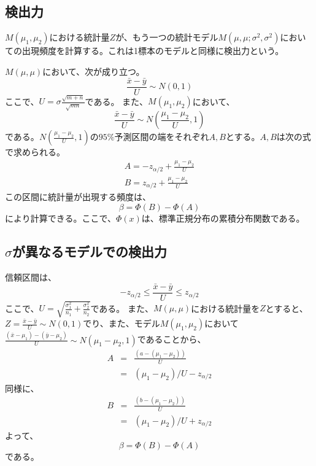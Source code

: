 \subsection{検出力}
$M(\mu_1,\mu_2)$における統計量$Z$が、もう一つの統計モデル$M(\mu,\mu;\sigma^2,\sigma^2)$においての出現頻度を計算する。これは1標本のモデルと同様に検出力という。

$M(\mu,\mu)$において、次が成り立つ。
\begin{equation*}
    \frac{\bar{x}-\bar{y}}{U} \sim N(0,1)
\end{equation*}
ここで、$U=\sigma\frac{\sqrt{m+n}}{\sqrt{mn}}$である。
また、$M(\mu_1,\mu_2)$において、
\begin{equation*}
    \frac{\bar{x}-\bar{y}}{U}\sim N(\frac{\mu_1-\mu_2}{U},1)
\end{equation*}
である。$N(\frac{\mu_1-\mu_2}{U},1)$の$95\%$予測区間の端をそれぞれ$A,B$とする。$A,B$は次の式で求められる。
\begin{eqnarray*}
    A = -z_{\alpha/2}+\frac{\mu_1-\mu_2}{U}\\
    B = z_{\alpha/2}+\frac{\mu_1-\mu_2}{U}
\end{eqnarray*}
この区間に統計量が出現する頻度は、
\begin{equation*}
    \beta = \varPhi(B)-\varPhi(A)
\end{equation*}
により計算できる。ここで、$\varPhi(x)$は、標準正規分布の累積分布関数である。

\subsection{$\sigma$が異なるモデルでの検出力}
信頼区間は、
\begin{equation*}
    -z_{\alpha/2} \leq \frac{\bar{x}-\bar{y}}{U} \leq z_{\alpha/2}
\end{equation*}
ここで、$U=\sqrt{\frac{\sigma^2_1}{n_1}+\frac{\sigma^2_2}{n_2}}$である。
また、$M(\mu,\mu)$における統計量を$Z$とすると、$Z = \frac{\bar{x}-\bar{y}}{U}\sim N(0,1)$でり、また、モデル$M(\mu_1,\mu_2)$において$\frac{(\bar{x}-\mu_1)-(\bar{y}-\mu_2)}{U} \sim N(\mu_1-\mu_2,1)$であることから、
\begin{eqnarray*}
    A &=& \frac{(a-(\mu_1-\mu_2))}{U} \\
        &=& (\mu_1-\mu_2)/U-z_{\alpha/2}
\end{eqnarray*}
同様に、
\begin{eqnarray*}
    B &=& \frac{(b-(\mu_1-\mu_2))}{U} \\
        &=& (\mu_1-\mu_2)/U+z_{\alpha/2}
\end{eqnarray*}
よって、
\begin{equation*}
    \beta = \varPhi(B)-\varPhi(A)
\end{equation*}
である。



